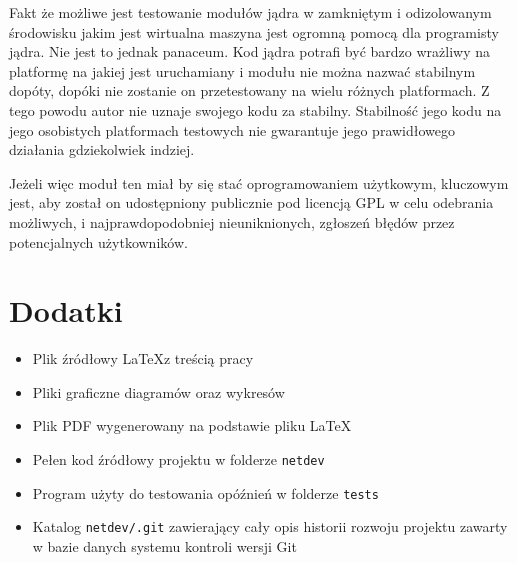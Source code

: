 \documentclass[10pt]{scrartcl}
\begin{document}
Fakt że możliwe jest testowanie modułów jądra w zamkniętym i odizolowanym środowisku jakim jest wirtualna maszyna jest ogromną pomocą dla programisty jądra. Nie jest to jednak panaceum. Kod jądra potrafi być bardzo wrażliwy na platformę na jakiej jest uruchamiany i modułu nie można nazwać stabilnym dopóty, dopóki nie zostanie on przetestowany na wielu różnych platformach. Z tego powodu autor nie uznaje swojego kodu za stabilny. Stabilność jego kodu na jego osobistych platformach testowych nie gwarantuje jego prawidłowego działania gdziekolwiek indziej.

Jeżeli więc moduł ten miał by się stać oprogramowaniem użytkowym, kluczowym jest, aby został on udostępniony publicznie pod licencją GPL w celu odebrania możliwych, i najprawdopodobniej nieuniknionych, zgłoszeń błędów przez potencjalnych użytkowników.

\section{Dodatki}

\begin{itemize}
\itemsep1pt\parskip0pt
\item
  Plik źródłowy \LaTeX  z treścią pracy
\item
  Pliki graficzne diagramów oraz wykresów
\item
  Plik PDF wygenerowany na podstawie pliku \LaTeX
\item
  Pełen kod źródłowy projektu w folderze \texttt{netdev}
\item
  Program użyty do testowania opóźnień w folderze \texttt{tests}
\item
  Katalog \texttt{netdev/.git} zawierający cały opis historii rozwoju projektu
  zawarty w bazie danych systemu kontroli wersji Git
\end{itemize}
\end{document}

